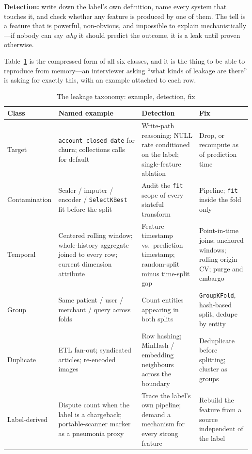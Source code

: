 \textbf{Detection:} write down the label's own definition, name every system that touches it, and check whether any feature is produced by one of them. The tell is a feature that is powerful, non-obvious, and impossible to explain mechanistically---if nobody can say \emph{why} it should predict the outcome, it is a leak until proven otherwise.

Table~\ref{cml:tab:leakage_taxonomy} is the compressed form of all six classes, and it is the thing to be able to reproduce from memory---an interviewer asking ``what kinds of leakage are there'' is asking for exactly this, with an example attached to each row.

\begin{table}[H]
\centering
\small
\caption{The leakage taxonomy: example, detection, fix}
\label{cml:tab:leakage_taxonomy}
\begin{tabularx}{\textwidth}{lXXX}
\toprule
\textbf{Class} & \textbf{Named example} & \textbf{Detection} & \textbf{Fix} \\
\midrule
Target & \texttt{account\_closed\_date} for churn; collections calls for default & Write-path reasoning; NULL rate conditioned on the label; single-feature ablation & Drop, or recompute as of prediction time \\
Contamination & Scaler / imputer / encoder / \texttt{SelectKBest} fit before the split & Audit the \texttt{fit} scope of every stateful transform & Pipeline; \texttt{fit} inside the fold only \\
Temporal & Centered rolling window; whole-history aggregate joined to every row; current dimension attribute & Feature timestamp vs.\ prediction timestamp; random-split minus time-split gap & Point-in-time joins; anchored windows; rolling-origin CV; purge and embargo \\
Group & Same patient / user / merchant / query across folds & Count entities appearing in both splits & \texttt{GroupKFold}, hash-based split, dedupe by entity \\
Duplicate & ETL fan-out; syndicated articles; re-encoded images & Row hashing; MinHash / embedding neighbours across the boundary & Deduplicate before splitting; cluster as groups \\
Label-derived & Dispute count when the label is a chargeback; portable-scanner marker as a pneumonia proxy & Trace the label's own pipeline; demand a mechanism for every strong feature & Rebuild the feature from a source independent of the label \\
\bottomrule
\end{tabularx}
\end{table}


